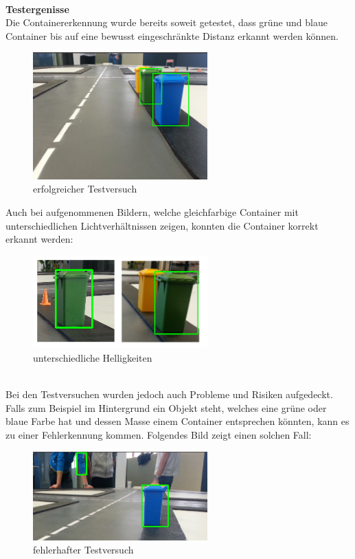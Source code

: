 \\[0.2cm]
\textbf{Testergenisse} \\[0.2cm]
Die Containererkennung wurde bereits soweit getestet, dass grüne und blaue Container bis auf eine bewusst eingeschränkte Distanz erkannt werden können. 
\begin{figure}[H]%
\centering
\includegraphics[width=0.6\textwidth]{03_Loesungskonzept/pictures/containererkennung_blau_gruen.png}
\caption{erfolgreicher Testversuch}
\label{fig:erfolgreicher Testversuch}
\end{figure}
Auch bei aufgenommenen Bildern, welche gleichfarbige Container mit unterschiedlichen Lichtverhältnissen zeigen, konnten die Container korrekt erkannt werden:
\begin{figure}[H]%
\centering
\includegraphics[width=0.6\textwidth]{03_Loesungskonzept/pictures/containererkennung_div_brightness.png}
\caption{unterschiedliche Helligkeiten}
\label{fig:unterschiedliche Helligkeiten}
\end{figure} \\
Bei den Testversuchen wurden jedoch auch Probleme und Risiken aufgedeckt. Falls zum Beispiel im Hintergrund ein Objekt steht, welches eine grüne oder blaue Farbe hat und dessen Masse einem Container entsprechen könnten, kann es zu einer Fehlerkennung kommen. Folgendes Bild zeigt einen solchen Fall:
\begin{figure}[H]%
\centering
\includegraphics[width=0.6\textwidth]{03_Loesungskonzept/pictures/objekterkennung_blau_fehl.png}
\caption{fehlerhafter Testversuch}
\label{fig:fehlerhafter Testversuch}
\end{figure} \\
